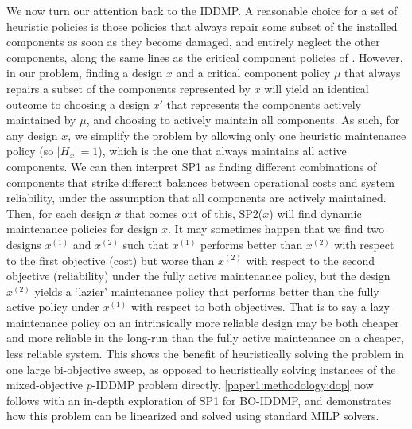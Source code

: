 \documentclass[11pt,authoryear,a4paper]{article}
\theoremstyle{definition}
\begin{document}
{{We now turn our attention back to the IDDMP. A reasonable choice for a set of heuristic policies is those policies that always repair some subset of the installed components as soon as they become damaged, and entirely neglect the other components, along the same lines as the critical component policies of \cite{flynn2004heuristic}. However, in our problem, finding a design $x$ and a critical component policy $\mu$ that always repairs a subset of the components represented by $x$ will yield an identical outcome to choosing a design $x'$ that represents the components actively maintained by $\mu$, and choosing to actively maintain all components. As such, for any design $x$, we simplify the problem by allowing only one heuristic maintenance policy (so $|H_x|=1$), which is the one that always maintains all active components.} We can then interpret SP1 as finding different combinations of components that strike different balances between operational costs and system reliability, under the assumption that all components are actively maintained. Then, for each design $x$ that comes out of this, SP2($x$) will find dynamic maintenance policies for design $x$. It may sometimes happen that we find two designs $x^{(1)}$ and $x^{(2)}$ such that $x^{(1)}$ performs better than $x^{(2)}$ with respect to the first objective (cost) but worse than $x^{(2)}$ with respect to the second objective (reliability) under the fully active maintenance policy, but the design $x^{(2)}$ yields a `lazier' maintenance policy that performs better than the fully active policy under $x^{(1)}$ with respect to both objectives. That is to say a lazy maintenance policy on an intrinsically more reliable design may be both cheaper and more reliable in the long-run than the fully active maintenance on a cheaper, less reliable system. This shows the benefit of heuristically solving the problem in one large bi-objective sweep, as opposed to heuristically solving instances of the mixed-objective $p$-IDDMP problem directly. \autoref{paper1:methodology:dop} now follows with an in-depth exploration of SP1 for BO-IDDMP, and demonstrates how this problem can be linearized and solved using standard MILP solvers.
 
}
\end{document}
